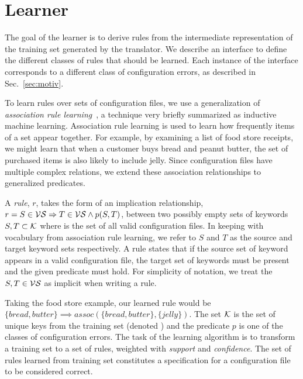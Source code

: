 \section{Learner}
\label{sec-learn}

The goal of the learner is to derive rules from the intermediate representation of the training set generated by the translator.
We describe an interface to define the different classes of rules that should be learned.
Each instance of the interface corresponds to a different class of configuration errors, as described in Sec.~\ref{sec:motiv}.

To learn rules over sets of configuration files, we use a generalization of \textit{association rule learning}~\cite{agrawal1993mining}, a technique very briefly summarized as inductive machine learning.
Association rule learning is used to learn how frequently items of a set appear together.
For example, by examining a list of food store receipts, we might learn that when a customer buys bread and peanut butter, the set of purchased items is also likely to include jelly.
Since configuration files have multiple complex relations, we extend these association relationships to generalized predicates.

A \textit{rule}, $r$, takes the form of an implication relationship, $r = S \in \mathcal{VS} \Rightarrow T \in \mathcal{VS} \land p(S,T)$, between two possibly empty sets of keywords $S,T \subset \mathcal{K}$ where \validSet is the set of all valid configuration files.
In keeping with vocabulary from association rule learning, we refer to $S$ and $T$ as the source and target keyword sets respectively.
A rule states that if the source set of keyword appears in a valid configuration file, the target set of keywords must be present and the given predicate must hold.
For simplicity of notation, we treat the $S,T \in \mathcal{VS}$ as implicit when writing a rule.

Taking the food store example, our learned rule would be $\{bread, butter\} \implies assoc(\{bread,butter\},\{jelly\})$.
The set $\mathcal{K}$ is the set of unique keys from the training set (denoted \trainingSet) and the predicate $p$ is one of the classes of configuration errors.
The task of the learning algorithm is to transform a training set to a set of rules, weighted with \textit{support} and \textit{confidence}.
The set of rules learned from training set \trainingSet constitutes a specification for a configuration file to be considered correct.

